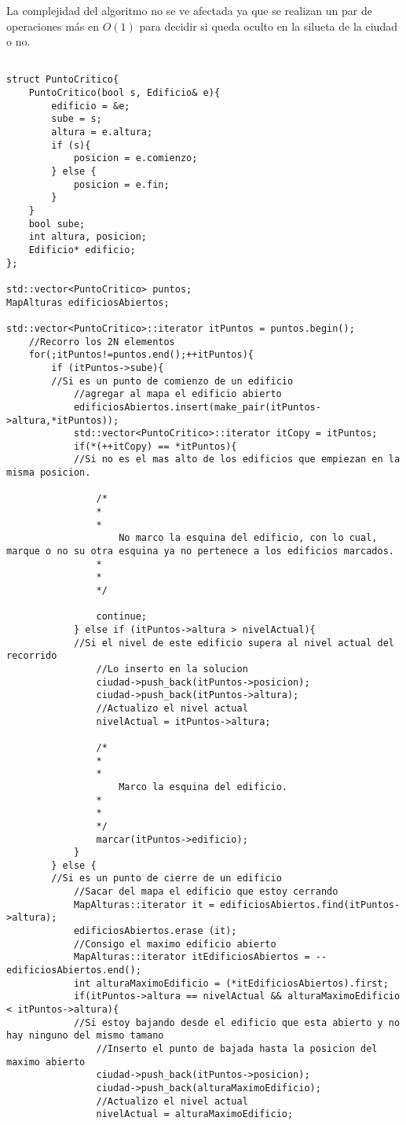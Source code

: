 La complejidad del algoritmo no se ve afectada ya que se realizan un par de operaciones más en $O(1)$ para decidir si queda oculto en la silueta de la ciudad o no.


\begin{lstlisting}

struct PuntoCritico{
	PuntoCritico(bool s, Edificio& e){
		edificio = &e;
		sube = s;
		altura = e.altura;
		if (s){
			posicion = e.comienzo;
		} else {
			posicion = e.fin;
		}
	}
	bool sube;
	int altura, posicion;
	Edificio* edificio;
};

std::vector<PuntoCritico> puntos;
MapAlturas edificiosAbiertos;

std::vector<PuntoCritico>::iterator itPuntos = puntos.begin();
	//Recorro los 2N elementos
	for(;itPuntos!=puntos.end();++itPuntos){
		if (itPuntos->sube){
		//Si es un punto de comienzo de un edificio
			//agregar al mapa el edificio abierto
			edificiosAbiertos.insert(make_pair(itPuntos->altura,*itPuntos));
			std::vector<PuntoCritico>::iterator itCopy = itPuntos;
 			if(*(++itCopy) == *itPuntos){
 			//Si no es el mas alto de los edificios que empiezan en la misma posicion.	

 				/*
 				*
 				*
 					No marco la esquina del edificio, con lo cual, marque o no su otra esquina ya no pertenece a los edificios marcados.
 				*
 				*
 				*/

				continue;
			} else if (itPuntos->altura > nivelActual){
			//Si el nivel de este edificio supera al nivel actual del recorrido
				//Lo inserto en la solucion
				ciudad->push_back(itPuntos->posicion);
				ciudad->push_back(itPuntos->altura);
				//Actualizo el nivel actual
				nivelActual = itPuntos->altura;

				/*
 				*
 				*
 					Marco la esquina del edificio.
 				*
 				*
 				*/
 				marcar(itPuntos->edificio);
			}
		} else {
		//Si es un punto de cierre de un edificio
			//Sacar del mapa el edificio que estoy cerrando
			MapAlturas::iterator it = edificiosAbiertos.find(itPuntos->altura);
			edificiosAbiertos.erase (it);
			//Consigo el maximo edificio abierto
			MapAlturas::iterator itEdificiosAbiertos = --edificiosAbiertos.end();
			int alturaMaximoEdificio = (*itEdificiosAbiertos).first;
			if(itPuntos->altura == nivelActual && alturaMaximoEdificio < itPuntos->altura){
			//Si estoy bajando desde el edificio que esta abierto y no hay ninguno del mismo tamano
				//Inserto el punto de bajada hasta la posicion del maximo abierto
				ciudad->push_back(itPuntos->posicion);
				ciudad->push_back(alturaMaximoEdificio);
				//Actualizo el nivel actual
				nivelActual = alturaMaximoEdificio;
				

\end{lstlisting}
